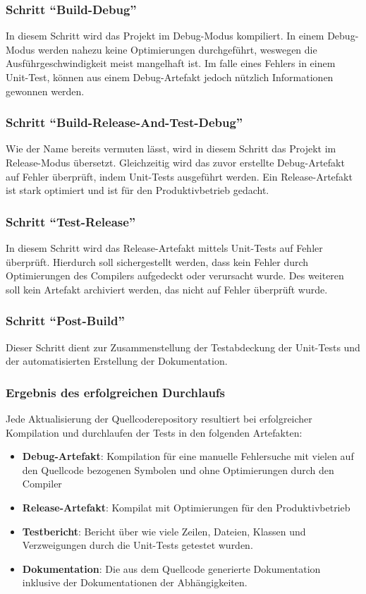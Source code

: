 \subsubsection{Schritt \enquote{Build-Debug}}
In diesem Schritt wird das Projekt im Debug-Modus kompiliert.
In einem Debug-Modus werden nahezu keine Optimierungen durchgeführt, weswegen die Ausführgeschwindigkeit meist mangelhaft ist.
Im falle eines Fehlers in einem Unit-Test, können aus einem Debug-Artefakt jedoch nützlich Informationen gewonnen werden.

\subsubsection{Schritt \enquote{Build-Release-And-Test-Debug}}
Wie der Name bereits vermuten lässt, wird in diesem Schritt das Projekt im Release-Modus übersetzt.
Gleichzeitig wird das zuvor erstellte Debug-Artefakt auf Fehler überprüft, indem Unit-Tests ausgeführt werden.
Ein Release-Artefakt ist stark optimiert und ist für den Produktivbetrieb gedacht.

\subsubsection{Schritt \enquote{Test-Release}}
In diesem Schritt wird das Release-Artefakt mittels Unit-Tests auf Fehler überprüft.
Hierdurch soll sichergestellt werden, dass kein Fehler durch Optimierungen des Compilers aufgedeckt oder verursacht wurde.
Des weiteren soll kein Artefakt archiviert werden, das nicht auf Fehler überprüft wurde.

\subsubsection{Schritt \enquote{Post-Build}}
Dieser Schritt dient zur Zusammenstellung der Testabdeckung der Unit-Tests und der automatisierten  Erstellung der Dokumentation.

\subsubsection{Ergebnis des erfolgreichen Durchlaufs}
Jede Aktualisierung der Quellcoderepository resultiert bei erfolgreicher Kompilation und durchlaufen der Tests in den folgenden Artefakten:
\begin{itemize}
	\item \textbf{Debug-Artefakt}: Kompilation für eine manuelle Fehlersuche mit vielen auf den Quellcode bezogenen Symbolen und ohne Optimierungen durch den Compiler
	\item \textbf{Release-Artefakt}: Kompilat mit Optimierungen für den Produktivbetrieb
	\item \textbf{Testbericht}: Bericht über wie viele Zeilen, Dateien, Klassen und Verzweigungen durch die Unit-Tests getestet wurden.
	\item \textbf{Dokumentation}: Die aus dem Quellcode generierte Dokumentation inklusive der Dokumentationen der Abhängigkeiten.
\end{itemize}

